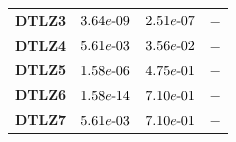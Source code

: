 \documentclass{article}
\begin{document}
\begin{table}[!htp]
\begin{tiny}
\begin{tabular}{c|ccc}
\textbf{DTLZ3} & $\cellcolor{gray25} 3.64e\makebox[0.1cm]{-}09 $ & $ \cellcolor{gray25} 2.51e\makebox[0.1cm]{-}07 $ & $ -$ \\
\textbf{DTLZ4} & $\cellcolor{gray25} 5.61e\makebox[0.1cm]{-}03 $ & $ \cellcolor{gray25} 3.56e\makebox[0.1cm]{-}02 $ & $ -$ \\
\textbf{DTLZ5} & $\cellcolor{gray25} 1.58e\makebox[0.1cm]{-}06 $ & $ 4.75e\makebox[0.1cm]{-}01 $ & $ -$ \\
\textbf{DTLZ6} & $\cellcolor{gray25} 1.58e\makebox[0.1cm]{-}14 $ & $ 7.10e\makebox[0.1cm]{-}01 $ & $ -$ \\
\textbf{DTLZ7} & $\cellcolor{gray25} 5.61e\makebox[0.1cm]{-}03 $ & $ 7.10e\makebox[0.1cm]{-}01 $ & $ -$ \\
  \hline
  \end{tabular}
  \end{tiny}
\end{table}
\end{document}
